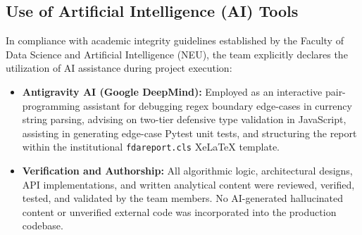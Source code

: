 \subsection{Use of Artificial Intelligence (AI) Tools}
In compliance with academic integrity guidelines established by the Faculty of Data Science and Artificial Intelligence (NEU), the team explicitly declares the utilization of AI assistance during project execution:
\begin{itemize}
  \item \textbf{Antigravity AI (Google DeepMind):} Employed as an interactive pair-programming assistant for debugging regex boundary edge-cases in currency string parsing, advising on two-tier defensive type validation in JavaScript, assisting in generating edge-case Pytest unit tests, and structuring the report within the institutional \texttt{fdareport.cls} XeLaTeX template.
  \item \textbf{Verification and Authorship:} All algorithmic logic, architectural designs, API implementations, and written analytical content were reviewed, verified, tested, and validated by the team members. No AI-generated hallucinated content or unverified external code was incorporated into the production codebase.
\end{itemize}
